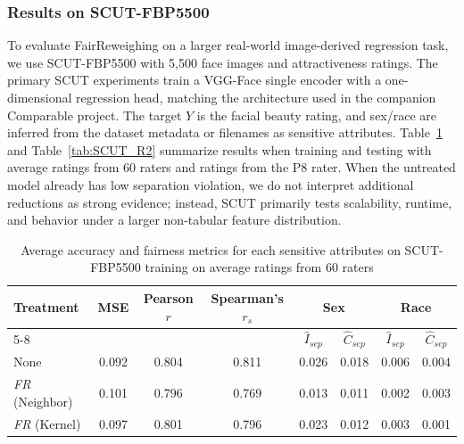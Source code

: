 \subsubsection{Results on SCUT-FBP5500}

To evaluate FairReweighing on a larger real-world image-derived regression task, we use SCUT-FBP5500 with 5,500 face images and attractiveness ratings. The primary SCUT experiments train a VGG-Face single encoder with a one-dimensional regression head, matching the architecture used in the companion Comparable project. The target $Y$ is the facial beauty rating, and sex/race are inferred from the dataset metadata or filenames as sensitive attributes. Table~\ref{tab:SCUT_avg} and Table~\ref{tab:SCUT_R2} summarize results when training and testing with average ratings from 60 raters and ratings from the P8 rater. When the untreated model already has low separation violation, we do not interpret additional reductions as strong evidence; instead, SCUT primarily tests scalability, runtime, and behavior under a larger non-tabular feature distribution.

\begin{table}[ht]
    \setlength\extrarowheight{3pt}
  \caption{Average accuracy and fairness metrics for each sensitive attributes on SCUT-FBP5500 training on average ratings from 60 raters}
  \label{tab:SCUT_avg}
  \begin{center}
  \begin{tabular}{l|c|c|c|c|c|c|c}
  \hline \multirow{2}{*}{Treatment} & \multirow{2}{*}{MSE} & \multirow{2}{*}{Pearson $r$} & \multirow{2}{*}{Spearman's $r_s$} & \multicolumn{2}{c|}{Sex} & \multicolumn{2}{c}{Race} \\ \cline{5-8}
  
  & & & & $\hat{I}_{sep}$ & $\hat{C}_{sep}$ & $\hat{I}_{sep}$ & $\hat{C}_{sep}$ \\ \hline
  
  {None} & 0.092 & 0.804 & 0.811 & 0.026 & 0.018 & 0.006 & 0.004 \\ 
  
  {\emph{FR} (Neighbor)} & 0.101 & 0.796 & 0.769 & 0.013 & 0.011 & 0.002 &  0.003 \\
  
  {\emph{FR} (Kernel)} & 0.097 &0.801 &0.796 &0.023 &0.012 &0.003 &0.001 \\  \hline
  \end{tabular}
  \end{center}
\end{table}

